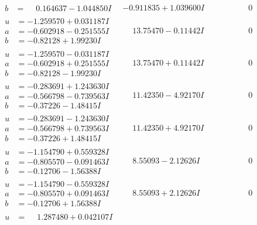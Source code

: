 \documentclass[1p]{elsarticle_modified}
\theoremstyle{definition}
\begin{document}
$$\begin{array}{c|c|c}
\begin{aligned}
b &= \phantom{-}0.164637 - 1.044850 I\end{aligned}
 & -0.911835 + 1.039600 I & \phantom{-0.000000 } 0 \\ \hline\begin{aligned}
u &= -1.259570 + 0.031187 I \\
a &= -0.602918 - 0.251555 I \\
b &= -0.82128 + 1.99230 I\end{aligned}
 & \phantom{-}13.75470 - 0.11442 I & \phantom{-0.000000 } 0 \\ \hline\begin{aligned}
u &= -1.259570 - 0.031187 I \\
a &= -0.602918 + 0.251555 I \\
b &= -0.82128 - 1.99230 I\end{aligned}
 & \phantom{-}13.75470 + 0.11442 I & \phantom{-0.000000 } 0 \\ \hline\begin{aligned}
u &= -0.283691 + 1.243630 I \\
a &= -0.566798 - 0.739563 I \\
b &= -0.37226 - 1.48415 I\end{aligned}
 & \phantom{-}11.42350 - 4.92170 I & \phantom{-0.000000 } 0 \\ \hline\begin{aligned}
u &= -0.283691 - 1.243630 I \\
a &= -0.566798 + 0.739563 I \\
b &= -0.37226 + 1.48415 I\end{aligned}
 & \phantom{-}11.42350 + 4.92170 I & \phantom{-0.000000 } 0 \\ \hline\begin{aligned}
u &= -1.154790 + 0.559328 I \\
a &= -0.805570 - 0.091463 I \\
b &= -0.12706 - 1.56388 I\end{aligned}
 & \phantom{-}8.55093 - 2.12626 I & \phantom{-0.000000 } 0 \\ \hline\begin{aligned}
u &= -1.154790 - 0.559328 I \\
a &= -0.805570 + 0.091463 I \\
b &= -0.12706 + 1.56388 I\end{aligned}
 & \phantom{-}8.55093 + 2.12626 I & \phantom{-0.000000 } 0 \\ \hline\begin{aligned}
u &= \phantom{-}1.287480 + 0.042107 I \\

\end{aligned}
\end{array}$$
\end{document}
